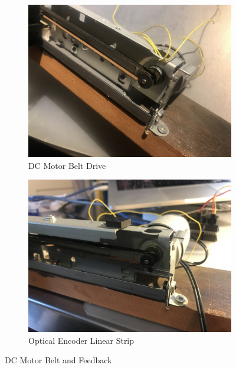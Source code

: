 \documentclass[12pt]{article}
\begin{document}
\begin{figure}[H]
\centering
\begin{subfigure}{.5\textwidth}
  \centering
  \includegraphics[width=1\linewidth]{figures/IMG_5674.jpg}
  \caption{DC Motor Belt Drive}
  \label{fig:dc}
\end{subfigure}%
\begin{subfigure}{.5\textwidth}
  \centering
  \includegraphics[width=1\linewidth]{figures/IMG_5807.jpg}
  \caption{Optical Encoder Linear Strip}
  \label{fig:opt}
\end{subfigure}
\caption{DC Motor Belt and Feedback}
\end{figure}
\end{document}
